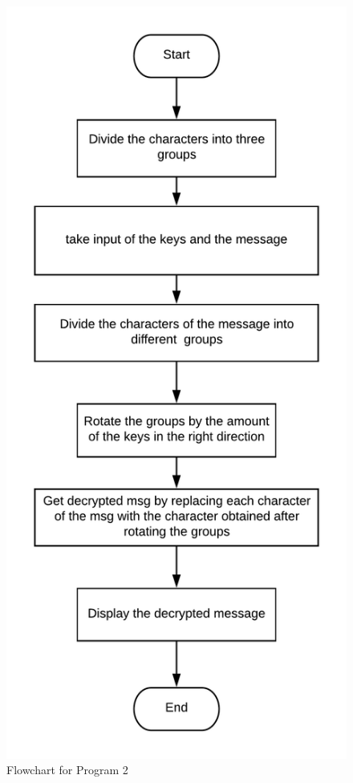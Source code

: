 \documentclass[12pt]{article}
\begin{document}
\begin{figure}[h]
\begin{center}
\includegraphics[scale=0.9]{ps2_fc.png}
\caption{Flowchart for Program 2}
\end{center}
\end{figure}
\end{document}
